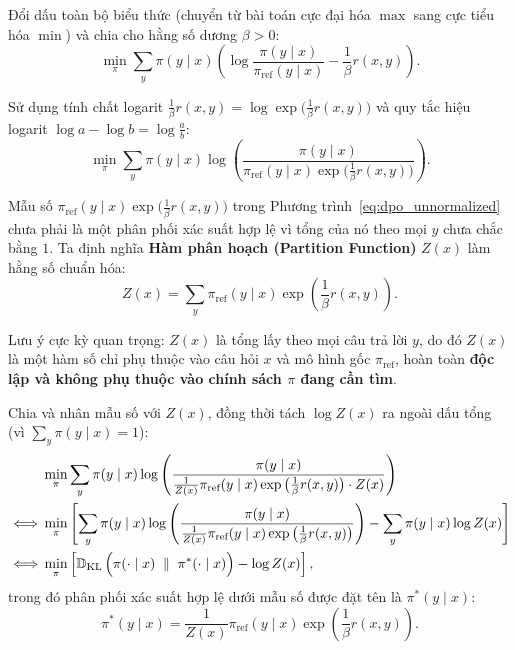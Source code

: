 Đổi dấu toàn bộ biểu thức (chuyển từ bài toán cực đại hóa $\max$ sang cực tiểu hóa $\min$) và chia cho hằng số dương $\beta > 0$:
\begin{equation}
    \min_{\pi} \sum_{y} \pi(y \mid x) \left( \log \frac{\pi(y \mid x)}{\pi_{\text{ref}}(y \mid x)} - \frac{1}{\beta} r(x, y) \right).
\end{equation}

Sử dụng tính chất logarit $\frac{1}{\beta} r(x, y) = \log \exp\big(\frac{1}{\beta} r(x, y)\big)$ và quy tắc hiệu logarit $\log a - \log b = \log \frac{a}{b}$:
\begin{equation}
    \min_{\pi} \sum_{y} \pi(y \mid x) \log \left( \frac{\pi(y \mid x)}{\pi_{\text{ref}}(y \mid x) \exp\big(\frac{1}{\beta} r(x, y)\big)} \right).
    \label{eq:dpo_unnormalized}
\end{equation}

Mẫu số $\pi_{\text{ref}}(y \mid x) \exp\big(\frac{1}{\beta} r(x, y)\big)$ trong Phương trình~\eqref{eq:dpo_unnormalized} chưa phải là một phân phối xác suất hợp lệ vì tổng của nó theo mọi $y$ chưa chắc bằng $1$. Ta định nghĩa \textbf{Hàm phân hoạch (Partition Function)} $Z(x)$ làm hằng số chuẩn hóa:
\begin{equation}
    Z(x) = \sum_{y} \pi_{\text{ref}}(y \mid x) \exp\left( \frac{1}{\beta} r(x, y) \right).
    \label{eq:partition_function}
\end{equation}
\begin{remark}
Lưu ý cực kỳ quan trọng: $Z(x)$ là tổng lấy theo mọi câu trả lời $y$, do đó $Z(x)$ là một hàm số chỉ phụ thuộc vào câu hỏi $x$ và mô hình gốc $\pi_{\text{ref}}$, hoàn toàn \textbf{độc lập và không phụ thuộc vào chính sách $\pi$ đang cần tìm}.
\end{remark}

Chia và nhân mẫu số với $Z(x)$, đồng thời tách $\log Z(x)$ ra ngoài dấu tổng (vì $\sum_y \pi(y \mid x) = 1$):
\begin{align}
    &\min_{\pi} \sum_{y} \pi(y \mid x) \log \left( \frac{\pi(y \mid x)}{\frac{1}{Z(x)} \pi_{\text{ref}}(y \mid x) \exp\big(\frac{1}{\beta} r(x, y)\big) \cdot Z(x)} \right) \nonumber \\
    \iff &\min_{\pi} \left[ \sum_{y} \pi(y \mid x) \log \left( \frac{\pi(y \mid x)}{\frac{1}{Z(x)} \pi_{\text{ref}}(y \mid x) \exp\big(\frac{1}{\beta} r(x, y)\big)} \right) - \sum_{y} \pi(y \mid x) \log Z(x) \right] \nonumber \\
    \iff &\min_{\pi} \left[ \operatorname{\mathbb{D}_{\mathrm{KL}}}\Big(\pi(\cdot \mid x) \;\parallel\; \pi^*(\cdot \mid x)\Big) - \log Z(x) \right],
    \label{eq:dpo_kl_closed}
\end{align}
trong đó phân phối xác suất hợp lệ dưới mẫu số được đặt tên là $\pi^*(y \mid x)$:
\begin{equation}
    \pi^*(y \mid x) = \frac{1}{Z(x)} \pi_{\text{ref}}(y \mid x) \exp\left( \frac{1}{\beta} r(x, y) \right).
    \label{eq:gibbs_solution}
\end{equation}

